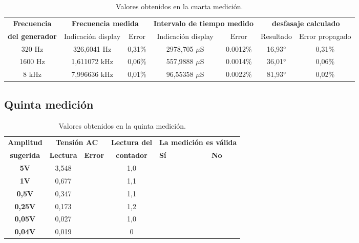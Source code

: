 \documentclass{article}
\newcommand{\tick}{\ding{52}}
\begin{document}
\begin{table}[!hbt]
	\begin{center}

		\begin{tabular}{|c|c|c|c|c|c|c|} \hline
			\textbf{Frecuencia} & \multicolumn{2}{c|}{\textbf{Frecuencia medida}} & \multicolumn{2}{c|}{\textbf{Intervalo de tiempo medido}} & \multicolumn{2}{c|}{\textbf{desfasaje calculado}} \\\cline{2-7}
			\textbf{del generador} & Indicación display & Error & Indicación display & Error & Resultado & Error propagado \\\hline
			
			320 Hz & 326,6041 Hz & 0,31\% & 2978,705 $\mu$S & 0.0012\% & 16,93° & 0,31\% \\\hline
			1600 Hz & 1,611072 kHz & 0,06\% & 557,9888 $\mu$S & 0.0014\% & 36,01° & 0,06\% \\\hline
			8 kHz & 7,996636 kHz & 0,01\% & 96,55358 $\mu$S & 0.0022\% & 81,93° & 0,02\% \\\hline

		\end{tabular}

	\caption{Valores obtenidos en la cuarta medición.}
	\end{center}
\end{table}
\medskip



\subsection{Quinta medición}


\begin{table}[!hbt]
	\begin{center}

		\begin{tabular}{|c|c|c|c|>{\centering}p{1.65cm}|c|} \hline
			\textbf{Amplitud} & \multicolumn{2}{c|}{\textbf{Tensión AC}} & \textbf{Lectura del} & \multicolumn{2}{c|}{\textbf{La medición es válida}} \\\cline{2-3}\cline{5-6}
			\textbf{sugerida} & \textbf{Lectura} & \textbf{Error} & \textbf{contador} & \textbf{Sí} & \textbf{No} \\\hline
			
			\textbf{5V} & 3,548 &  & 1,0 & \tick &  \\\hline
			\textbf{1V} & 0,677 &  & 1,1 &  &  \\\hline
			\textbf{0,5V} & 0,347 &  & 1,1 &  &  \\\hline
			\textbf{0,25V} & 0,173 &  & 1,2 &  &  \\\hline
			\textbf{0,05V} & 0,027 &  & 1,0 &  &  \\\hline
			\textbf{0,04V} & 0,019 &  & 0 &  &  \\\hline

		\end{tabular}

	\caption{Valores obtenidos en la quinta medición.}
	\end{center}
\end{table}
\medskip
\end{document}
